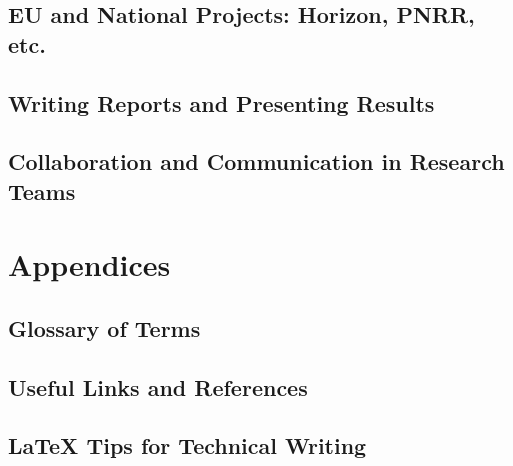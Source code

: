 \documentclass[11pt]{article}
\begin{document}
	\subsection{EU and National Projects: Horizon, PNRR, etc.}
	\subsection{Writing Reports and Presenting Results}
	\subsection{Collaboration and Communication in Research Teams}
	
	\section{Appendices}
	\subsection{Glossary of Terms}
	\subsection{Useful Links and References}
	\subsection{LaTeX Tips for Technical Writing}
	
\end{document}
